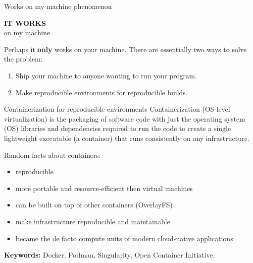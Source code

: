 \documentclass[
	9pt,
	hyperref = {unicode,pdfpagelabels=false},
	aspectratio = 43
	]{beamer}
\begin{document}
\begin{frame}{Works on my machine phenomenon}
	\begin{center}
		\huge
		\textbf{IT WORKS}\\
		on my machine
	\end{center}

	\vfill

	Perhaps it \textbf{only} works on your machine. There are essentially two ways to solve the problem:
	\begin{enumerate}
	 	\item Ship your machine to anyone wanting to run your program.
	 	\item Make reproducible environments for reproducible builds.
	\end{enumerate} 
\end{frame}

\begin{frame}{Containerization for reproducible environments}
	Containerization (OS-level virtualization) is the packaging of software code with just the operating system (OS) libraries and dependencies required to run the code to create a single lightweight executable (a container) that runs consistently on any infrastructure.

	\vfill

	Random facts about containers:
	\begin{itemize}
		\item reproducible
		\item more portable and resource-efficient then virtual machines
		\item can be built on top of other containers (OverlayFS)
		\item make infrastructure reproducible and maintainable
		\item became the de facto compute units of modern cloud-native applications
	\end{itemize}

	\vfill

	\textbf{Keywords:} Docker, Podman, Singularity, Open Container Initiative.
\end{frame}
\end{document}
